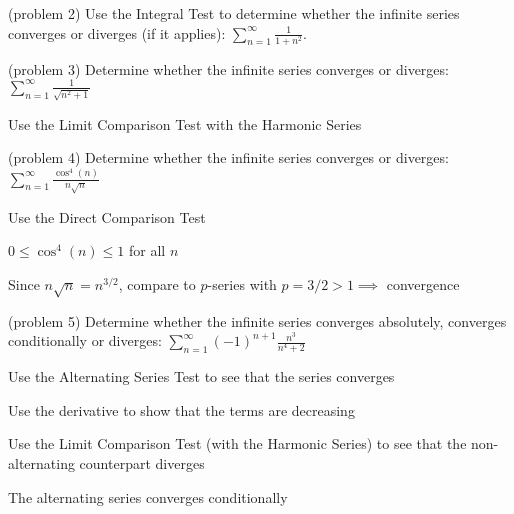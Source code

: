 \documentclass[handout]{ximera}
\begin{document}
\begin{problem}(problem 2)
Use the Integral Test to determine whether the infinite series converges or diverges (if it applies):
$\displaystyle \sum_{n=1}^\infty \frac{1}{1 + n^2}$.
\end{problem}


\begin{problem}(problem 3)
Determine whether the infinite series converges or diverges: 
$\displaystyle \sum_{n=1}^\infty \frac{1}{\sqrt{n^2 + 1}}$

\begin{hint}
Use the Limit Comparison Test with the Harmonic Series
\end{hint}


\end{problem}

\begin{problem}(problem 4)
Determine whether the infinite series converges or diverges: $\displaystyle \sum_{n=1}^\infty \frac{\cos^4(n)}{n\sqrt{n}}$

\begin{hint}
Use the Direct Comparison Test
\end{hint}

\begin{hint}
$\displaystyle 0 \leq \cos^4(n) \leq 1$ for all $n$
\end{hint}

\begin{hint}
Since $n\sqrt n = n^{3/2}$, compare to $p$-series with $p = 3/2 > 1 \implies$ convergence
\end{hint}

\end{problem}

\begin{problem}(problem 5)
Determine whether the infinite series converges absolutely, converges conditionally or diverges: 
$\displaystyle \sum_{n=1}^\infty (-1)^{n+1} \frac{n^3}{n^4 + 2}$

\begin{hint}
Use the Alternating Series Test to see that the series converges
\end{hint}
\begin{hint}
Use the derivative to show that the terms are decreasing
\end{hint}
\begin{hint}
Use the Limit Comparison Test (with the Harmonic Series) to see that the 
non-alternating counterpart diverges
\end{hint}


\begin{hint}
The alternating series converges conditionally
\end{hint}

\end{problem}
\end{document}
